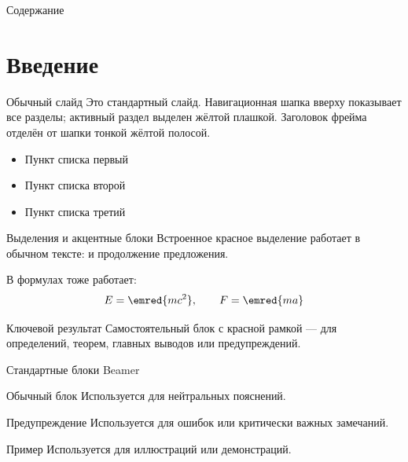 \documentclass[aspectratio=169,12pt,t]{beamer}
\begin{document}
\begin{frame}
  \titlepage
\end{frame}

\begin{frame}[nonavbar]{Содержание}
  \tableofcontents
\end{frame}

\section{Введение}

\begin{frame}{Обычный слайд}
  Это стандартный слайд. Навигационная шапка вверху показывает
  все разделы; активный раздел выделен жёлтой плашкой.
  Заголовок фрейма отделён от шапки тонкой жёлтой полосой.

  \begin{itemize}
    \item Пункт списка первый
    \item Пункт списка второй
    \item Пункт списка третий
  \end{itemize}
\end{frame}

\begin{frame}{Выделения и акцентные блоки}
  Встроенное красное выделение работает в обычном тексте:
   и продолжение предложения.

  В формулах тоже работает:
  \[
    E = \emred{mc^2}, \qquad F = \emred{ma}
  \]

  \begin{emphblock}{Ключевой результат}
    Самостоятельный блок с красной рамкой — для определений,
    теорем, главных выводов или предупреждений.
  \end{emphblock}
\end{frame}

\begin{frame}{Стандартные блоки Beamer}
  \begin{block}{Обычный блок}
    Используется для нейтральных пояснений.
  \end{block}

  \begin{alertblock}{Предупреждение}
    Используется для ошибок или критически важных замечаний.
  \end{alertblock}

  \begin{exampleblock}{Пример}
    Используется для иллюстраций или демонстраций.
  \end{exampleblock}
\end{frame}
\end{document}
